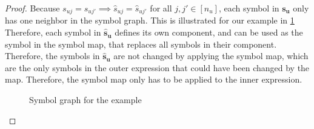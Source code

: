 \begin{proof}
    \small
    Because $s_{uj} = s_{uj'} \implies \hat{s}_{uj} = \hat{s}_{uj'}$ for all $j, j' \in [n_u]$,
    each symbol in $\bm{s_u}$ only has one neighbor in the symbol graph.
    This is illustrated for our example in \cref{fig:nested_expressions:example_symbol_graph_intro}
    Therefore, each symbol in $\bm{\hat{s}_u}$ defines its own component,
    and can be used as the symbol in the symbol map, that replaces all symbols in their component.
    Therefore, the symbols in $\bm{\hat{s}_u}$ are not changed by applying the symbol map, which are the only symbols in the outer expression that could have been changed by the map.
    Therefore, the symbol map only has to be applied to the inner expression.

    \begin{figure}[h]
        \centering
        \caption{Symbol graph for the example}
        \label{fig:nested_expressions:example_symbol_graph_intro}
    \end{figure}
\end{proof}
\bigskip